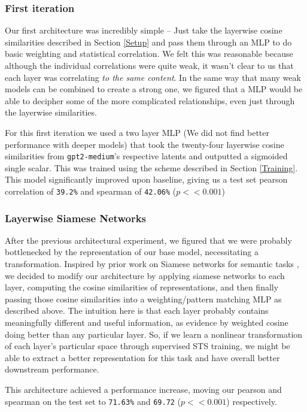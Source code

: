 \documentclass{article}
\begin{document}
\subsubsection{First iteration}
Our first architecture was incredibly simple -- Just take the layerwise cosine similarities described in Section \ref {Setup} and pass them through an MLP to do basic weighting and statistical correlation. We felt this was reasonable because although the individual correlations were quite weak, it wasn't clear to us that each layer was correlating \textit{to the same content}. In the same way that many weak models can be combined to create a strong one, we figured that a MLP would be able to decipher some of the more complicated relationships, even just through the layerwise similarities. 

For this first iteration we used a two layer MLP (We did not find better performance with deeper models) that took the twenty-four layerwise cosine similarities from \verb|gpt2-medium|'s respective latents and outputted a sigmoided single scalar. This was trained using the scheme described in Section \ref{Training}. This model significantly improved upon baseline, giving us a test set pearson correlation of \verb|39.2%| and spearman of \verb|42.06%| ($p<< 0.001$)

\subsubsection{Layerwise Siamese Networks}
After the previous architectural experiment, we figured that we were probably bottlenecked by the representation of our base model, necessitating a transformation. Inspired by prior work on Siamese networks for semantic tasks \cite{reimers2019sentencebertsentenceembeddingsusing}, we decided to modify our architecture by applying siamese networks to each layer, computing the cosine similarities of  representations, and then finally passing those cosine similarities into a weighting/pattern matching MLP as described above. The intuition here is that each layer probably contains meaningfully different and useful information, as evidence by weighted cosine doing better than any particular layer. So, if we learn a nonlinear transformation of each layer's particular space through supervised STS training, we might be able to extract a better representation for this task and have overall better downstream performance.

This architecture achieved a  performance increase, moving our pearson and spearman on the test set to \verb|71.63%| and \verb|69.72| ($p << 0.001$) respectively.
\end{document}
